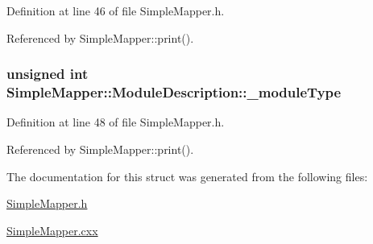 Definition at line 46 of file SimpleMapper.h.

Referenced by SimpleMapper::print().\hypertarget{struct_simple_mapper_1_1_module_description_afcf7709bc493381c3fbd78925fe07a46}{
\subsubsection[{\_\-moduleType}]{\setlength{\rightskip}{0pt plus 5cm}unsigned int {\bf SimpleMapper::ModuleDescription::\_\-moduleType}}}
\label{struct_simple_mapper_1_1_module_description_afcf7709bc493381c3fbd78925fe07a46}


Definition at line 48 of file SimpleMapper.h.

Referenced by SimpleMapper::print().

The documentation for this struct was generated from the following files:\begin{DoxyCompactItemize}
\item 
\hyperlink{_simple_mapper_8h}{SimpleMapper.h}\item 
\hyperlink{_simple_mapper_8cxx}{SimpleMapper.cxx}\end{DoxyCompactItemize}
